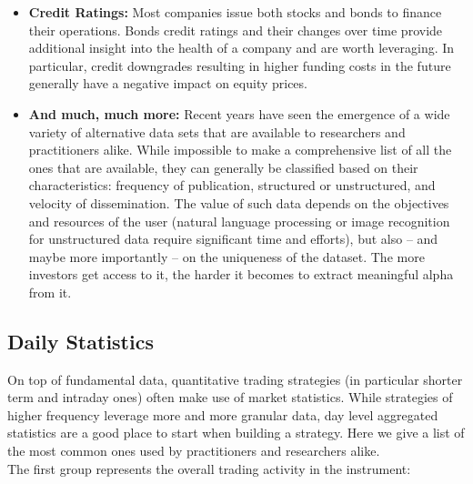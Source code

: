 \begin{itemize}
\item \textbf{Credit Ratings:} Most companies issue both stocks and bonds to finance their operations. Bonds credit ratings and their changes over time provide additional insight into the health of a company and are worth leveraging. In particular, credit downgrades resulting in higher funding costs in the future generally have a negative impact on equity prices.

\item \textbf{And much, much more:} Recent years have seen the emergence of a wide variety of alternative data sets that are available to researchers and practitioners alike.  While impossible to make a comprehensive list of all the ones that are available, they can generally be classified based on their characteristics: frequency of publication, structured or unstructured, and velocity of dissemination. The value of such data depends on the objectives and resources of the user (natural language processing or image recognition for unstructured data require significant time and efforts), but also -- and maybe more importantly -- on the uniqueness of the dataset. The more investors get access to it, the harder it becomes to extract meaningful alpha from it.\\
\end{itemize}

\subsection{Daily Statistics}
On top of fundamental data, quantitative trading strategies (in particular shorter term and intraday ones) often make use of market statistics. While strategies of higher frequency leverage more and more granular data, day level aggregated statistics are a good place to start when building a strategy. Here we give a list of the most common ones used by practitioners and researchers alike. \\

The first group represents the overall trading activity in the instrument: 

